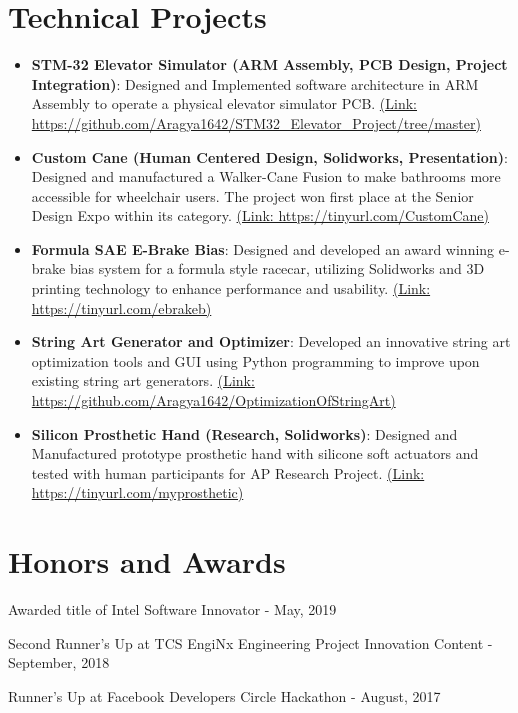 \documentclass[a4paper,10pt]{article}
\newcommand{\resumeItem}[2]{
  \item\small{
    \textbf{#1}{: #2 \vspace{-2pt}}
  }
}
\newcommand{\resumeSubItem}[2]{\resumeItem{#1}{#2}\vspace{-3pt}}
\newcommand{\resumeSubHeadingListStart}{\begin{itemize}[leftmargin=*]}
\newcommand{\resumeSubHeadingListEnd}{\end{itemize}}
\begin{document}
\section{Technical Projects}
  \resumeSubHeadingListStart
    \resumeSubItem{STM-32 Elevator Simulator (ARM Assembly, PCB Design, Project Integration)}
    {Designed and Implemented software architecture in ARM Assembly to operate a physical elevator simulator PCB. \href{https://github.com/Aragya1642/STM32_Elevator_Project/tree/master}{(Link: https://github.com/Aragya1642/STM32\_Elevator\_Project/tree/master)}}
\vspace{2pt}
    \resumeSubItem{Custom Cane (Human Centered Design, Solidworks, Presentation)}
    {Designed and manufactured a Walker-Cane Fusion to make bathrooms more accessible for wheelchair users. The project won first place at the Senior Design Expo within its category. \href{https://tinyurl.com/CustomCane}{(Link: https://tinyurl.com/CustomCane)}}
\vspace{2pt}
    \resumeSubItem{Formula SAE E-Brake Bias}
    {Designed and developed an award winning e-brake bias system for a formula style racecar, utilizing Solidworks and 3D printing technology to enhance performance and usability.  \href{https://tinyurl.com/ebrakeb}{(Link: https://tinyurl.com/ebrakeb)}}
\vspace{2pt}
    \resumeSubItem{String Art Generator and Optimizer}
    {Developed an innovative string art optimization tools and GUI using Python programming to improve upon existing string art generators. \href{https://github.com/Aragya1642/OptimizationOfStringArt}{(Link: https://github.com/Aragya1642/OptimizationOfStringArt)}}
\vspace{2pt}
    \resumeSubItem{Silicon Prosthetic Hand (Research, Solidworks)}
    {Designed and Manufactured prototype prosthetic hand with silicone soft actuators and tested with human participants for AP Research Project. \href{https://tinyurl.com/myprosthetic}{(Link: https://tinyurl.com/myprosthetic)}}
  \resumeSubHeadingListEnd
\vspace{-5pt}

\section{Honors and Awards}
\begin{description}[font=$\bullet$]
  \item {Awarded title of Intel Software Innovator - May, 2019}
\vspace{-5pt}
  \item {Second Runner's Up at TCS EngiNx Engineering Project Innovation Content - September, 2018 }
\vspace{-5pt}
  \item {Runner's Up at Facebook Developers Circle Hackathon - August, 2017}
\end{description}
\vspace{-5pt}
\end{document}

